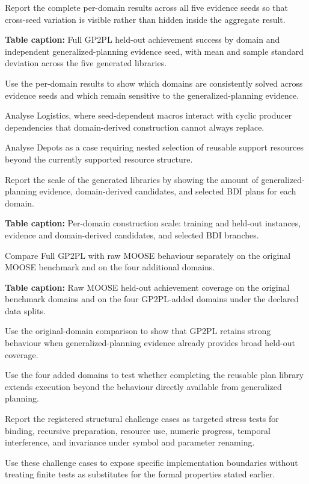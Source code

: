Report the complete per-domain results across all five evidence seeds so that cross-seed variation is visible rather than hidden inside the aggregate result.

\textbf{Table caption:} Full GP2PL held-out achievement success by domain and independent generalized-planning evidence seed, with mean and sample standard deviation across the five generated libraries.

Use the per-domain results to show which domains are consistently solved across evidence seeds and which remain sensitive to the generalized-planning evidence.

Analyse Logistics, where seed-dependent macros interact with cyclic producer
dependencies that domain-derived construction cannot always replace.

Analyse Depots as a case requiring nested selection of reusable support resources beyond the currently supported resource structure.

Report the scale of the generated libraries by showing the amount of generalized-planning evidence, domain-derived candidates, and selected BDI plans for each domain.

\textbf{Table caption:} Per-domain construction scale: training and held-out
instances, evidence and domain-derived candidates, and selected BDI branches.

Compare Full GP2PL with raw MOOSE behaviour separately on the original MOOSE benchmark and on the four additional domains.

\textbf{Table caption:} Raw MOOSE held-out achievement coverage on the original benchmark domains and on the four GP2PL-added domains under the declared data splits.

Use the original-domain comparison to show that GP2PL retains strong behaviour when generalized-planning evidence already provides broad held-out coverage.

Use the four added domains to test whether completing the reusable plan library extends execution beyond the behaviour directly available from generalized planning.

Report the registered structural challenge cases as targeted stress tests for binding, recursive preparation, resource use, numeric progress, temporal interference, and invariance under symbol and parameter renaming.

Use these challenge cases to expose specific implementation boundaries without treating finite tests as substitutes for the formal properties stated earlier.


